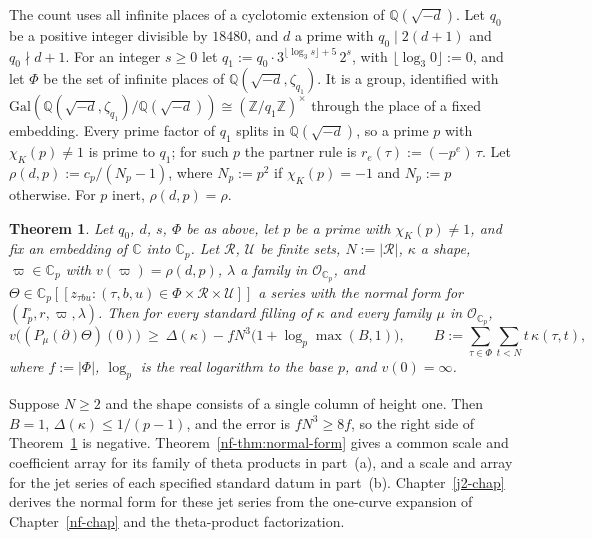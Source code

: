 \documentclass[reqno]{amsart}
\newcounter{chap}
\theoremstyle{definition}
\theoremstyle{plain}
\newtheorem{theorem}{Theorem}[section]
\newcommand{\Z}{\mathbb{Z}}
\newcommand{\Q}{\mathbb{Q}}
\newcommand{\C}{\mathbb{C}}
\newcommand{\Op}{\mathcal{O}_{\C_p}}
\begin{document}
The count uses all infinite places of a cyclotomic extension of \(\Q(\sqrt{-d})\).  Let \(q_0\) be a positive integer divisible by \(18480\), and \(d\) a prime with \(q_0 \mid 2(d+1)\) and \(q_0 \nmid d + 1\).  For an integer \(s \ge 0\) let \(q_1 := q_0 \cdot 3^{\lfloor \log_3 s \rfloor + 5}\, 2^s\), with \(\lfloor \log_3 0 \rfloor := 0\), and let \(\Phi\) be the set of infinite places of \(\Q(\sqrt{-d}, \zeta_{q_1})\).  It is a group, identified with \(\mathrm{Gal}(\Q(\sqrt{-d}, \zeta_{q_1})/\Q(\sqrt{-d})) \cong (\Z/q_1\Z)^\times\) through the place of a fixed embedding.  Every prime factor of \(q_1\) splits in \(\Q(\sqrt{-d})\), so a prime \(p\) with \(\chi_K(p) \ne 1\) is prime to \(q_1\); for such \(p\) the partner rule is \(r_e(\tau) := (-p^e)\,\tau\).  Let \(\rho(d, p) := c_p/(N_p - 1)\), where \(N_p := p^2\) if \(\chi_K(p) = -1\) and \(N_p := p\) otherwise.  For \(p\) inert, \(\rho(d,p) = \rho\).

\begin{theorem}\label{thm:count}
Let \(q_0\), \(d\), \(s\), \(\Phi\) be as above, let \(p\) be a prime with \(\chi_K(p) \ne 1\), and fix an embedding of \(\C\) into \(\C_p\).  Let \(\mathcal{R}\), \(\mathcal{U}\) be finite sets, \(N := |\mathcal{R}|\), \(\kappa\) a shape, \(\varpi \in \C_p\) with \(v(\varpi) = \rho(d,p)\), \(\lambda\) a family in \(\Op\), and \(\Theta \in \C_p[[z_{\tau b u} : (\tau, b, u) \in \Phi \times \mathcal{R} \times \mathcal{U}]]\) a series with the normal form for \((I_p^\circ, r, \varpi, \lambda)\).  Then for every standard filling of \(\kappa\) and every family \(\mu\) in \(\Op\),
\[
  v\bigl((P_\mu(\partial)\Theta)(0)\bigr) \ \ge\ \Delta(\kappa) - f N^3 \bigl(1 + \log_p \max(B, 1)\bigr),
  \qquad B := \sum_{\tau \in \Phi} \sum_{t < N} t\, \kappa(\tau, t),
\]
where \(f := |\Phi|\), \(\log_p\) is the real logarithm to the base \(p\), and \(v(0) = \infty\).
\end{theorem}

Suppose \(N\ge2\) and the shape consists of a single column of height one.  Then \(B=1\), \(\Delta(\kappa)\le 1/(p-1)\), and the error is \(fN^3\ge8f\), so the right side of Theorem~\ref{thm:count} is negative.  Theorem~\ref{nf-thm:normal-form} gives a common scale and coefficient array for its family of theta products in part~(a), and a scale and array for the jet series of each specified standard datum in part~(b).  Chapter~\ref{j2-chap} derives the normal form for these jet series from the one-curve expansion of Chapter~\ref{nf-chap} and the theta-product factorization.
\end{document}
